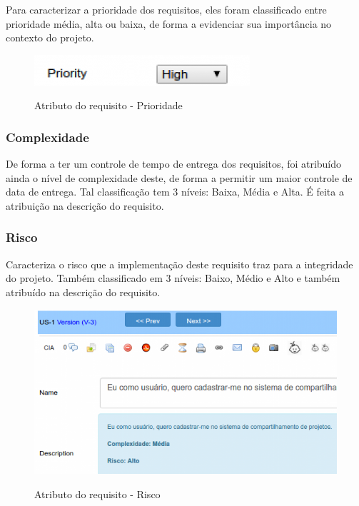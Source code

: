 Para caracterizar a prioridade dos requisitos, eles foram classificado entre prioridade média, alta ou baixa, de forma a evidenciar sua importância no contexto do projeto.

\FloatBarrier
\begin{figure}[!htpd]
		\centering
		\includegraphics[scale=0.4]{figuras/prioridade}
		\label{img:prioridade}
		\caption{Atributo do requisito - Prioridade}
\end{figure}

\subsubsection{Complexidade}

De forma a ter um controle de tempo de entrega dos requisitos, foi atribuído ainda o nível de complexidade deste, de forma a permitir um maior controle de data de entrega. Tal classificação tem 3 níveis: Baixa, Média e Alta. É feita a atribuição na descrição do requisito.

\subsubsection{Risco}

Caracteriza o risco que a implementação deste requisito traz para a integridade do projeto. Também classificado em 3 níveis: Baixo, Médio e Alto e também atribuído na descrição do requisito.

\FloatBarrier
\begin{figure}[!htpd]
		\centering
		\includegraphics[scale=0.4]{figuras/risco}
		\label{img:risco}
		\caption{Atributo do requisito - Risco}
\end{figure}

